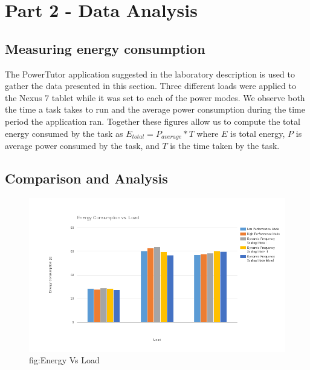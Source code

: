 \documentclass{article} %
\begin{document}
\section{Part 2 - Data Analysis}
\subsection{Measuring energy consumption}
The PowerTutor application suggested in the laboratory description is used to gather the data presented in this section. Three different loads were applied to the Nexus 7 tablet while it was set to each of the power modes. We observe both the time a task takes to run and the average power consumption during the time period the application ran. Together these figures allow us to compute the total energy consumed by the task as $E_{total} = P_{average}*T$ where $E$ is total energy, $P$ is average power consumed by the task, and $T$ is the time taken by the task.

\subsection{Comparison and Analysis}
\begin{figure}[!hbt]
\begin{center}
\includegraphics[width=.4\textwidth,keepaspectratio]{energy_vs_load.png}
\end{center}
\caption{fig:Energy Vs Load}
\label{FIG-TRANSMITTER}
\end{figure}
\end{document}
